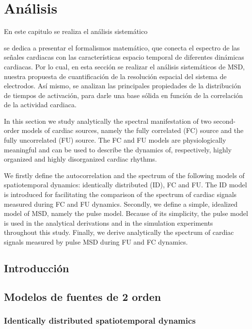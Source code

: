 
\chapter{Análisis}

\begin{resumen}
    En este capitulo se realiza el análisis sistemático 
    
 se dedica a presentar el formalismos matemático,
  que conecta el espectro de las señales cardiacas con las características
  espacio temporal de diferentes dinámicas cardiacas. Por lo cual, en esta
  sección se realizar el análisis sistemáticos de \ac{MSD}, nuestra propuesta de
  cuantificación de la resolución espacial del sistema de electrodos. Así mismo,
  se analizan las principales propiedades de la distribución de tiempos de
  activación, para darle una base sólida en función de la correlación de la
  actividad cardiaca.
  
 In this section we study analytically the spectral manifestation of two
 second-order models of cardiac sources, namely the fully correlated (FC) source
 and the fully uncorrelated (FU) source.  The FC and FU models are
 physiologically meaningful and can be used to describe the dynamics of,
 respectively, highly organized and highly disorganized cardiac rhythms.

 We firstly define the autocorrelation and the spectrum of the following models
 of spatiotemporal dynamics: identically distributed (ID), FC and FU. The ID
 model is introduced for facilitating the comparison of the spectrum of cardiac
 signals measured during FC and FU dynamics. Secondly, we define a simple,
 idealized model of MSD, namely the pulse model. Because of its simplicity, the
 pulse model is used in the analytical derivations and in the simulation
 experiments throughout this study. Finally, we derive analytically the spectrum
 of cardiac signals measured by pulse MSD during FU and FC dynamics.


\end{resumen}

\section{Introducción}
\section{Modelos de fuentes de 2 orden}
\subsection{Identically distributed spatiotemporal dynamics}

